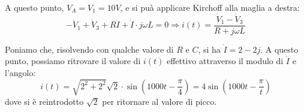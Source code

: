 \documentclass[a4paper,11pt]{article}
\begin{document}
A questo punto, $V_A = V_1 = 10V$, e si puà applicare Kirchoff alla maglia a destra:
$$
-\dot{V}_1 + \dot{V}_3 + R\dot{I} + \dot{I} \cdot j \omega L = 0 \Rightarrow i(t) = \frac{\dot{V}_1 - \dot{V}_3}{R + j\omega L}
$$

Poniamo che, risolvendo con qualche valore di $R$ e $C$, si ha $\dot{I} = 2 - 2j$.
A questo punto, possiamo ritrovare il valore di $i(t)$ effettivo attraverso il modulo di $\dot{I}$ e l'angolo:
$$
i(t) = \sqrt{2^2 + 2^2} \sqrt2 \cdot \sin\left(1000t - \frac{\pi}{4}\right) = 4 \sin\left(1000t - \frac{\pi}{t}\right)
$$
dove si è reintrodotto $\sqrt{2}$ per ritornare al valore di picco. 
\end{document}
